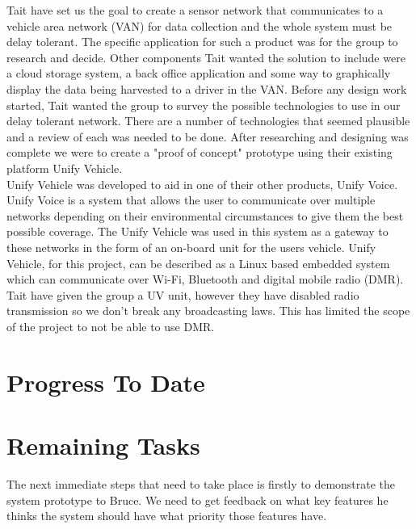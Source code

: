\documentclass[a4paper,12pt]{article}
\begin{document}
Tait have set us the goal to create a sensor network that communicates to a vehicle area network (VAN) for data collection and the whole system must be delay tolerant. The specific application for such a product was for the group to research and decide. Other components Tait wanted the solution to include were a cloud storage system, a back office application and some way to graphically display the data being harvested to a driver in the VAN. Before any design work started, Tait wanted the group to survey the possible technologies to use in our delay tolerant network. There are a number of technologies that seemed plausible and a review of each was needed to be done. After researching and designing was complete we were to create a "proof of concept" prototype using their existing platform Unify Vehicle.\\

Unify Vehicle was developed to aid in one of their other products, Unify Voice. Unify Voice is a system that allows the user to communicate over multiple networks depending on their environmental circumstances to give them the best possible coverage. The Unify Vehicle was used in this system as a gateway to these networks in the form of an on-board unit for the users vehicle. Unify Vehicle, for this project, can be described as a Linux based embedded system which can communicate over Wi-Fi, Bluetooth and digital mobile radio (DMR). Tait have given the group a UV unit, however they have disabled radio transmission so we don't break any broadcasting laws. This has limited the scope of the project to not be able to use DMR. \\


\clearpage

\section{Progress To Date}
\clearpage
\section{Remaining Tasks}
The next immediate steps that need to take place is firstly to demonstrate the system prototype to Bruce. We need to get feedback on what key features he thinks the system should have what priority those features have.
\end{document}
